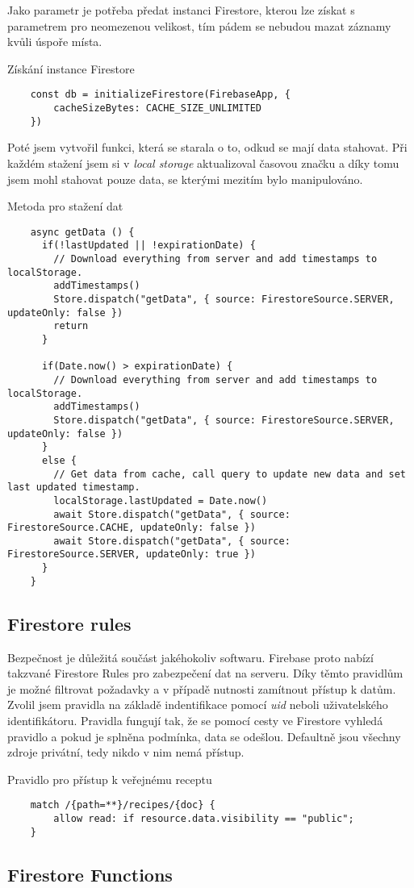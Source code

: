 Jako parametr je potřeba předat instanci Firestore, kterou lze získat s parametrem pro neomezenou velikost, tím pádem se nebudou
mazat záznamy kvůli úspoře místa.

\begin{listing}[h]
    \caption{Získání instance Firestore}
    \begin{verbatim}
    const db = initializeFirestore(FirebaseApp, {
        cacheSizeBytes: CACHE_SIZE_UNLIMITED
    })
    \end{verbatim}
\end{listing}

Poté jsem vytvořil funkci, která se starala o to, odkud se mají data stahovat. Při každém stažení jsem si v \emph{local storage} aktualizoval
časovou značku a díky tomu jsem mohl stahovat pouze data, se kterými mezitím bylo manipulováno.

\begin{listing}[h]
    \caption{Metoda pro stažení dat}
    \begin{verbatim}
    async getData () {
      if(!lastUpdated || !expirationDate) {
        // Download everything from server and add timestamps to localStorage.
        addTimestamps()
        Store.dispatch("getData", { source: FirestoreSource.SERVER, updateOnly: false })
        return
      }

      if(Date.now() > expirationDate) {
        // Download everything from server and add timestamps to localStorage.
        addTimestamps()
        Store.dispatch("getData", { source: FirestoreSource.SERVER, updateOnly: false })
      }
      else {
        // Get data from cache, call query to update new data and set last updated timestamp.
        localStorage.lastUpdated = Date.now()
        await Store.dispatch("getData", { source: FirestoreSource.CACHE, updateOnly: false })
        await Store.dispatch("getData", { source: FirestoreSource.SERVER, updateOnly: true })
      }
    }
    \end{verbatim}
\end{listing}


\subsection{Firestore rules}
Bezpečnost je důležitá součást jakéhokoliv softwaru. Firebase proto nabízí takzvané Firestore Rules pro zabezpečení dat na serveru.
Díky těmto pravidlům je možné filtrovat požadavky a v případě nutnosti zamítnout přístup k datům. Zvolil jsem pravidla na základě
indentifikace pomocí \emph{uid} neboli uživatelského identifikátoru. Pravidla fungují tak, že se pomocí cesty ve Firestore vyhledá
pravidlo a pokud je splněna podmínka, data se odešlou. Defaultně jsou všechny zdroje privátní, tedy nikdo v nim nemá přístup.

\begin{listing}[h]
    \caption{Pravidlo pro přístup k veřejnému receptu}
    \begin{verbatim}
    match /{path=**}/recipes/{doc} {
        allow read: if resource.data.visibility == "public";
    }
    \end{verbatim}
\end{listing}

\subsection{Firestore Functions}
